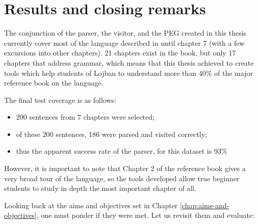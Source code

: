 \chapter{Results and closing remarks}

\vspace{0.5cm}

The conjunction of the parser, the visitor, and the PEG created in this thesis currently cover most of the language described in
 until chapter 7 (with a few excursions into other chapters). 21 chapters exist in the book,
but only 17 chapters that address grammar, which means that this thesis achieved to create tools which help students of
Lojban to understand more than 40\% of the major reference book on the language. \newline

The final test coverage is as follows:

\begin{itemize}
    \item 200 sentences from 7 chapters were selected;
    \item of these 200 sentences, 186 were parsed and visited correctly;
    \item thus the apparent success rate of the parser, for this dataset is 93\%
\end{itemize}

However, it is important to note that Chapter 2 of the reference book gives a very broad tour of the language, so the tools
developed allow true beginner students to study in depth the most important chapter of all.\newline

Looking back at the aims and objectives set in Chapter \ref{chap:aims-and-objectives}, one must ponder if they were met. Let us
revisit them and evaluate:

